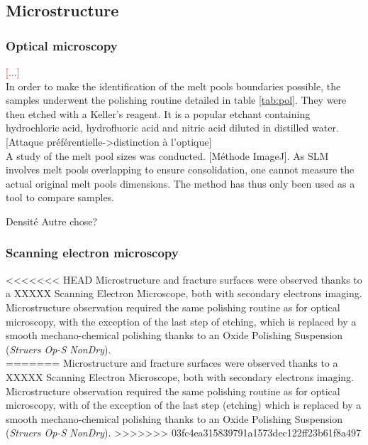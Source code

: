 \subsection{Microstructure}

\subsubsection{Optical microscopy}
\label{MMOM}

\textcolor{red}{[...]}\\

In order to make the identification of the melt pools boundaries possible, the samples underwent the polishing routine detailed in table \ref{tab:pol}. They were then etched with	a Keller's reagent. It is a popular etchant containing hydrochloric acid, hydrofluoric acid and nitric acid diluted in distilled water. [Attaque préférentielle->distinction à l'optique] \\

A study of the melt pool sizes was conducted. [Méthode ImageJ]. As SLM involves melt pools overlapping to ensure consolidation, one cannot measure the actual original melt pools dimensions. The method has thus only been used as a tool to compare samples.

Densité
Autre chose?

\subsubsection{Scanning electron microscopy}

<<<<<<< HEAD
Microstructure and fracture surfaces were observed thanks to a XXXXX Scanning Electron Microscope, both with secondary electrons imaging. Microstructure observation required the same polishing routine as for optical microscopy, with the exception of the last step of etching, which is replaced by a smooth mechano-chemical polishing thanks to an Oxide Polishing Suspension (\textit{Struers Op-S NonDry}).\\
=======
Microstructure and fracture surfaces were observed thanks to a XXXXX Scanning Electron Microscope, both with secondary electrons imaging. Microstructure observation required the same polishing routine as for optical microscopy, with of the exception of the last step (etching) which is replaced by a smooth mechano-chemical polishing thanks to an Oxide Polishing Suspension (\textit{Struers Op-S NonDry}).
>>>>>>> 03fc4ea315839791a1573dec122ff23b61f8a497

